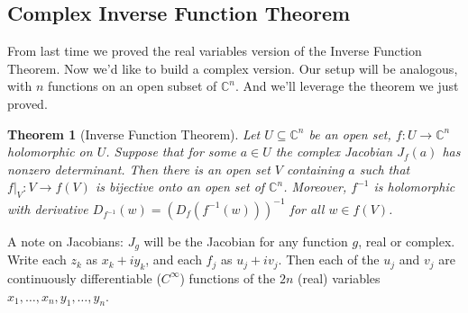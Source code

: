 \documentclass[12pt]{article}
\newcommand{\cx}{\mathbb{C}}
\newcommand\inv[1]{#1^{-1}}
\newcommand{\paren}[1]{\left( #1 \right)}
\newtheorem{theorem}{Theorem}[section]
\theoremstyle{definition}
\theoremstyle{remark}
\begin{document}
\subsection{Complex Inverse Function Theorem}
From last time we proved the real variables version of the Inverse Function Theorem. Now we'd like to build a complex version. Our setup will be analogous, with $n$ functions on an open subset of $\cx^n$. And we'll leverage the theorem we just proved.
\begin{theorem}[Inverse Function Theorem]
    Let $U \subseteq \cx^n$ be an open set, $f : U \to \cx^n$ holomorphic on $U$. Suppose that for some $a \in U$ the complex Jacobian $J_f(a)$ has nonzero determinant. Then there is an open set $V$ containing $a$ such that $f|_V : V \to f(V)$ is bijective onto an open set of $\cx^n$. Moreover, $\inv{f}$ is holomorphic with derivative $D_{\inv{f}}(w) = \inv{ \paren{ D_f \paren{ \inv{f}(w) } } }$ for all $w \in f(V)$.
\end{theorem}
A note on Jacobians: $J_g$ will be the Jacobian for any function $g$, real or complex. Write each $z_k$ as $x_k + i y_k$, and each $f_j$ as $u_j + iv_j$. Then each of the $u_j$ and $v_j$ are continuously differentiable ($C^{\infty}$) functions of the $2n$ (real) variables $x_1 , \dotsc , x_n , y_1 , \dotsc , y_n$.
\end{document}
